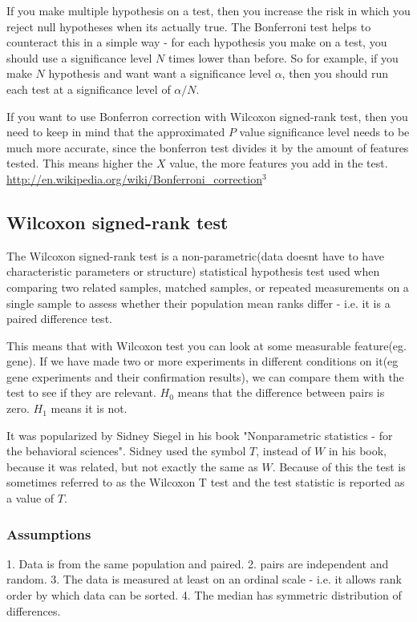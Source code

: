 \documentclass[12pt]{article}
\begin{document}
If you make multiple hypothesis on a test, then you increase the risk in which you reject null hypotheses when its actually true. The Bonferroni test helps to counteract this in a simple way - for each hypothesis you make on a test, you should use a significance level $N$ times lower than before. So for example, if you make $N$ hypothesis and want want a significance level $α$,  then you should run each test at a significance level of $α/N$.

If you want to use Bonferron correction with Wilcoxon signed-rank test, then you need to keep in mind that the approximated $P$ value significance level needs to be much more accurate, since the bonferron test divides it by the amount of features tested. This means higher the $X$ value, the more features you add in the test. \url{http://en.wikipedia.org/wiki/Bonferroni_correction}$^3$

\subsection{Wilcoxon signed-rank test}
The Wilcoxon signed-rank test is a non-parametric(data doesnt have to have characteristic parameters or structure) statistical hypothesis test used when comparing two related samples, matched samples, or repeated measurements on a single sample to assess whether their population mean ranks differ - i.e. it is a paired difference test.

This means that with Wilcoxon test you can look at some measurable feature(eg. gene). If we have made two or more experiments in different conditions on it(eg gene experiments and their confirmation results), we can compare them with the test to see if they are relevant. $H_0$ means that the difference between pairs is zero. $H_1$ means it is not.

It was popularized by Sidney Siegel in his book "Nonparametric statistics - for the behavioral sciences". Sidney used the symbol $T$, instead of $W$ in his book, because it was related, but not exactly the same as $W$. Because of this the test is sometimes referred to as the Wilcoxon T test and the test statistic is reported as a value of $T$.

\subsubsection{Assumptions}
1. Data is from the same population and paired.
2. pairs are independent and random.
3. The data is measured at least on an ordinal scale - i.e. it allows rank order by which data can be sorted.
4. The median has symmetric distribution of differences.
\end{document}
